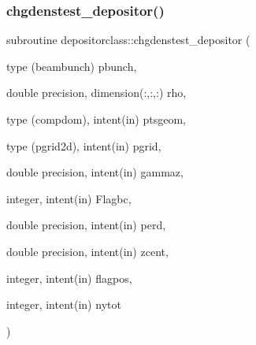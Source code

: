 \subsubsection{\texorpdfstring{chgdenstest\_depositor()}{chgdenstest\_depositor()}}
{\footnotesize\ttfamily subroutine depositorclass\+::chgdenstest\+\_\+depositor (\begin{DoxyParamCaption}\item[{type (beambunch)}]{pbunch,  }\item[{double precision, dimension(\+:,\+:,\+:)}]{rho,  }\item[{type (compdom), intent(in)}]{ptsgeom,  }\item[{type (pgrid2d), intent(in)}]{pgrid,  }\item[{double precision, intent(in)}]{gammaz,  }\item[{integer, intent(in)}]{Flagbc,  }\item[{double precision, intent(in)}]{perd,  }\item[{double precision, intent(in)}]{zcent,  }\item[{integer, intent(in)}]{flagpos,  }\item[{integer, intent(in)}]{nytot }\end{DoxyParamCaption})}

